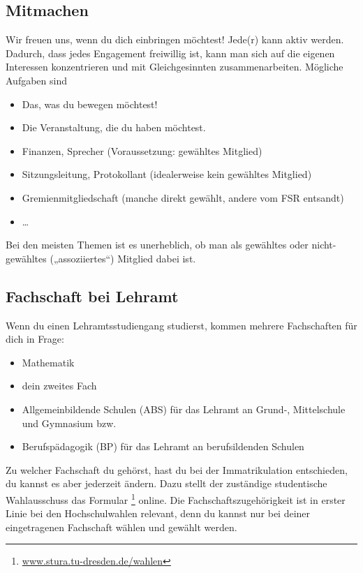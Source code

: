 \documentclass{scrartcl}
\begin{document}
\subsection*{Mitmachen}
\label{sub:mitmachen}
Wir freuen uns, wenn du dich einbringen möchtest! Jede(r) kann aktiv werden.
Dadurch, dass jedes Engagement freiwillig ist, kann man sich auf die eigenen Interessen konzentrieren
und mit Gleichgesinnten zusammenarbeiten. Mögliche Aufgaben sind
\begin{itemize}
  \item Das, was du bewegen möchtest!
  \item Die Veranstaltung, die du haben möchtest.
  \item Finanzen, Sprecher (Voraussetzung: gewähltes Mitglied)
  \item Sitzungsleitung, Protokollant (idealerweise kein gewähltes Mitglied)
  \item Gremienmitgliedschaft (manche direkt gewählt, andere vom FSR entsandt)
  \item \dots
\end{itemize}
Bei den meisten Themen ist es unerheblich, ob man als gewähltes oder nicht-gewähltes („assoziiertes“) Mitglied dabei ist.

\subsection*{Fachschaft bei Lehramt}
\label{sub:fachschaft_bei_lehramt}
Wenn du einen Lehramtsstudiengang studierst, kommen mehrere Fachschaften für dich in Frage:
\begin{itemize}
  \item Mathematik
  \item dein zweites Fach
  \item Allgemeinbildende Schulen (ABS) für das Lehramt an Grund-, Mittelschule und Gymnasium bzw.
  \item Berufspädagogik (BP) für das Lehramt an berufsildenden Schulen 
\end{itemize}
Zu welcher Fachschaft du gehörst, hast du bei der Immatrikulation entschieden,
du kannst es aber jederzeit ändern.
Dazu stellt der zuständige studentische Wahlausschuss das Formular
\footnote{\url{www.stura.tu-dresden.de/wahlen}} online.
  Die Fachschaftszugehörigkeit ist in erster Linie bei den Hochschulwahlen relevant,
  denn du kannst nur bei deiner eingetragenen Fachschaft wählen und gewählt werden.
\end{document}
